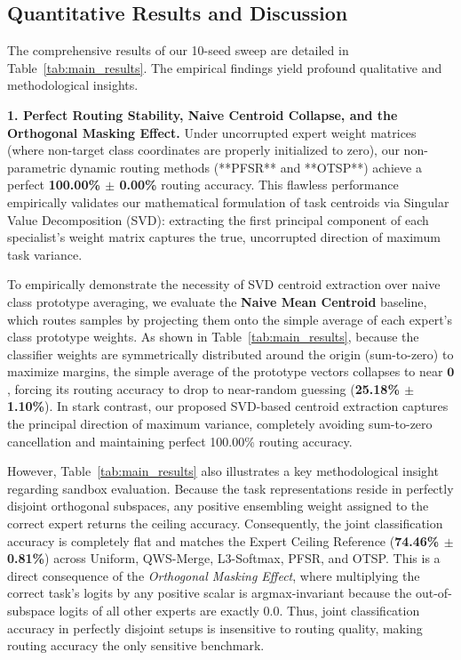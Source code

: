 \subsection{Quantitative Results and Discussion}
The comprehensive results of our 10-seed sweep are detailed in Table~\ref{tab:main_results}. The empirical findings yield profound qualitative and methodological insights.

\textbf{1. Perfect Routing Stability, Naive Centroid Collapse, and the Orthogonal Masking Effect.}
Under uncorrupted expert weight matrices (where non-target class coordinates are properly initialized to zero), our non-parametric dynamic routing methods (**PFSR** and **OTSP**) achieve a perfect \textbf{100.00\% $\pm$ 0.00\%} routing accuracy. This flawless performance empirically validates our mathematical formulation of task centroids via Singular Value Decomposition (SVD): extracting the first principal component of each specialist's weight matrix captures the true, uncorrupted direction of maximum task variance.

To empirically demonstrate the necessity of SVD centroid extraction over naive class prototype averaging, we evaluate the \textbf{Naive Mean Centroid} baseline, which routes samples by projecting them onto the simple average of each expert's class prototype weights. As shown in Table~\ref{tab:main_results}, because the classifier weights are symmetrically distributed around the origin (sum-to-zero) to maximize margins, the simple average of the prototype vectors collapses to near $\mathbf{0}$, forcing its routing accuracy to drop to near-random guessing (\textbf{25.18\% $\pm$ 1.10\%}). In stark contrast, our proposed SVD-based centroid extraction captures the principal direction of maximum variance, completely avoiding sum-to-zero cancellation and maintaining perfect 100.00\% routing accuracy.

However, Table~\ref{tab:main_results} also illustrates a key methodological insight regarding sandbox evaluation. Because the task representations reside in perfectly disjoint orthogonal subspaces, any positive ensembling weight assigned to the correct expert returns the ceiling accuracy. Consequently, the joint classification accuracy is completely flat and matches the Expert Ceiling Reference (\textbf{74.46\% $\pm$ 0.81\%}) across Uniform, QWS-Merge, L3-Softmax, PFSR, and OTSP. This is a direct consequence of the \textit{Orthogonal Masking Effect}, where multiplying the correct task's logits by any positive scalar is argmax-invariant because the out-of-subspace logits of all other experts are exactly $0.0$. Thus, joint classification accuracy in perfectly disjoint setups is insensitive to routing quality, making routing accuracy the only sensitive benchmark.

